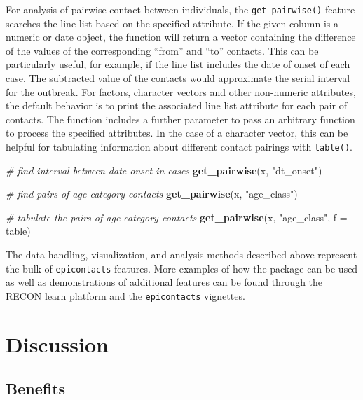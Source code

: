\documentclass[9pt,a4paper,]{extarticle}
\newenvironment{Shaded}{\begin{snugshade}}{\end{snugshade}}
\newcommand{\KeywordTok}[1]{\textcolor[rgb]{0.13,0.29,0.53}{\textbf{#1}}}
\newcommand{\DataTypeTok}[1]{\textcolor[rgb]{0.13,0.29,0.53}{#1}}
\newcommand{\StringTok}[1]{\textcolor[rgb]{0.31,0.60,0.02}{#1}}
\newcommand{\CommentTok}[1]{\textcolor[rgb]{0.56,0.35,0.01}{\textit{#1}}}
\newcommand{\NormalTok}[1]{#1}
\theoremstyle{definition}
\theoremstyle{definition}
\theoremstyle{definition}
\theoremstyle{remark}
\begin{document}
For analysis of pairwise contact between individuals, the \texttt{get\_pairwise()} feature searches the line list based on the specified attribute. If the given column is a numeric or date object, the function will return a vector containing the difference of the values of the corresponding ``from'' and ``to'' contacts. This can be particularly useful, for example, if the line list includes the date of onset of each case. The subtracted value of the contacts would approximate the serial interval for the outbreak\citep{fine:2003}. For factors, character vectors and other non-numeric attributes, the default behavior is to print the associated line list attribute for each pair of contacts. The function includes a further parameter to pass an arbitrary function to process the specified attributes. In the case of a character vector, this can be helpful for tabulating information about different contact pairings with \texttt{table()}.

\begin{Shaded}
\begin{Highlighting}[]
\CommentTok{# find interval between date onset in cases}
\KeywordTok{get_pairwise}\NormalTok{(x, }\StringTok{"dt_onset"}\NormalTok{)}

\CommentTok{# find pairs of age category contacts}
\KeywordTok{get_pairwise}\NormalTok{(x, }\StringTok{"age_class"}\NormalTok{)}

\CommentTok{# tabulate the pairs of age category contacts}
\KeywordTok{get_pairwise}\NormalTok{(x, }\StringTok{"age_class"}\NormalTok{, }\DataTypeTok{f =}\NormalTok{ table)}
\end{Highlighting}
\end{Shaded}

The data handling, visualization, and analysis methods described above represent the bulk of \texttt{epicontacts} features. More examples of how the package can be used as well as demonstrations of additional features can be found through the \href{https://www.reconlearn.org/}{RECON learn} platform and the \href{http://www.repidemicsconsortium.org/epicontacts/articles/index.html}{\texttt{epicontacts} vignettes}.

\section{Discussion}\label{discussion}

\subsection{Benefits}\label{benefits}
\end{document}

